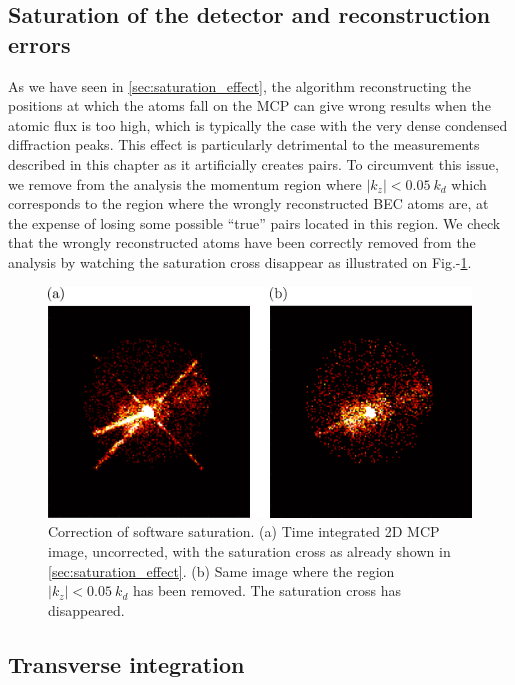 \subsection{Saturation of the detector and reconstruction errors}

As we have seen in \ref{sec:saturation_effect}, the algorithm reconstructing the positions at which the atoms fall on the MCP can give wrong results when the atomic flux is too high, which is typically the case with the very dense condensed diffraction peaks. This effect is particularly detrimental to the measurements described in this chapter as it artificially creates \kmk pairs. To circumvent this issue, we remove from the analysis the momentum region where $|k_z| < 0.05 \ k_d$ which corresponds to the region where the wrongly reconstructed BEC atoms are, at the expense of losing some possible ``true'' pairs located in this region. We check that the wrongly reconstructed atoms have been correctly removed from the analysis by watching the saturation cross disappear as illustrated on Fig.-\ref{fig:saturation_correction}.

\begin{figure}
    \centering
    \includegraphics[width=\textwidth]{Fig/Chapter4/correction_saturation.png}
    \caption[Correction of software saturation]{Correction of software saturation. (a) Time integrated 2D MCP image, uncorrected, with the saturation cross as already shown in \ref{sec:saturation_effect}. (b) Same image where the region $|k_z| < 0.05 \ k_d$ has been removed. The saturation cross has disappeared.}
    \label{fig:saturation_correction}
\end{figure}



\subsection{Transverse integration}

